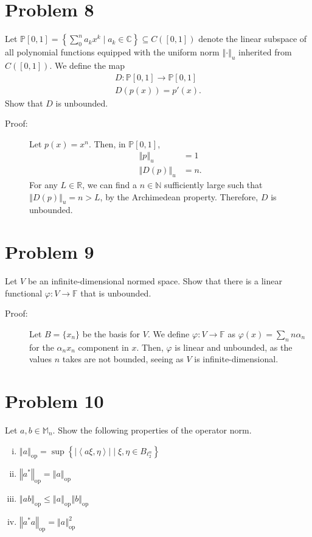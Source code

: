 \documentclass[8pt]{extarticle}
\newcommand{\N}{\mathbb{N}}
\newcommand{\R}{\mathbb{R}}
\newcommand{\C}{\mathbb{C}}
\newcommand{\iprod}[2]{\left\langle #1,#2\right\rangle}
\newcommand{\norm}[1]{\left\Vert #1\right\Vert}
\begin{document}
  \section{Problem 8}%
  Let $\mathbb{P}[0,1] = \left\{\sum_{0}^{n}a_kx^k\mid a_k\in\C\right\}\subseteq C([0,1])$ denote the linear subspace of all polynomial functions equipped with the uniform norm $\norm{\cdot}_{u}$ inherited from $C([0,1])$. We define the map
  \begin{align*}
    D:\mathbb{P}[0,1]\rightarrow \mathbb{P}[0,1]\\
    D(p(x)) = p'(x).
  \end{align*}
  Show that $D$ is unbounded.
  \begin{description}
    \item[Proof:] Let $p(x) = x^n$. Then, in $\mathbb{P}[0,1]$,
      \begin{align*}
        \norm{p}_u &= 1\\
        \norm{D(p)}_u &= n.
      \end{align*}
      For any $L\in \R$, we can find a $n\in \N$ sufficiently large such that $\norm{D(p)}_u = n > L$, by the Archimedean property. Therefore, $D$ is unbounded.
  \end{description}
  \section{Problem 9}%
  Let $V$ be an infinite-dimensional normed space. Show that there is a linear functional $\varphi: V\rightarrow \mathbb{F}$ that is unbounded.
  \begin{description}
    \item[Proof:] Let $B = \{x_n\}$ be the basis for $V$. We define $\varphi: V\rightarrow \mathbb{F}$ as $\varphi(x) = \sum_{n} n\alpha_n$ for the $\alpha_nx_n$ component in $x$. Then, $\varphi$ is linear and unbounded, as the values $n$ takes are not bounded, seeing as $V$ is infinite-dimensional.
  \end{description}
  \section{Problem 10}%
  Let $a,b\in \mathbb{M}_{n}$. Show the following properties of the operator norm.
  \begin{enumerate}[(i)]
    \item $\norm{a}_{\text{op}} = \sup\left\{|\iprod{a\xi}{\eta}|\mid \xi,\eta\in B_{\ell_{2}^{n}} \right\}$
    \item $\norm{a^{\ast}}_{\text{op}} = \norm{a}_{\text{op}}$
    \item $\norm{ab}_{\text{op}} \leq \norm{a}_{\text{op}}\norm{b}_{\text{op}}$
    \item $\norm{a^{\ast}a}_{\text{op}} = \norm{a}^{2}_{\text{op}}$
  \end{enumerate}
\end{document}
